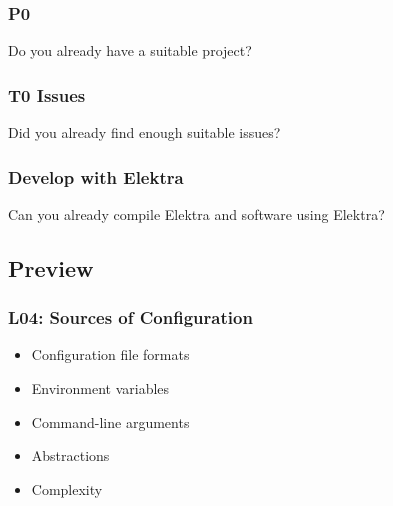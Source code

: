 \begin{frame}
	\frametitle{P0}

	\begin{task}
	Do you already have a suitable project?
	\end{task}
\end{frame}

\begin{frame}
	\frametitle{T0 Issues}

	\begin{task}
	Did you already find enough suitable issues?
	\end{task}
\end{frame}

\begin{frame}
	\frametitle{Develop with Elektra}

	\begin{task}
	Can you already compile Elektra and software using Elektra?
	\end{task}
\end{frame}

\subsection{Preview}

\begin{frame}
	\frametitle{L04: Sources of Configuration}

	\begin{itemize}
	\item Configuration file formats
	\item Environment variables
	\item Command-line arguments
	\item Abstractions
	\item Complexity
	\end{itemize}
\end{frame}

\appendix

\begin{frame}[allowframebreaks]
	
	
\end{frame}



